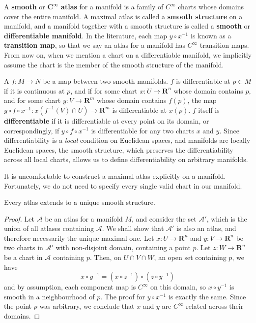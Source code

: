 A {\bf smooth} or {\bf $\mathbf{C^\infty}$ atlas} for a manifold is a family of $C^\infty$ charts whose domains cover the entire manifold. A maximal atlas is called a {\bf smooth structure} on a manifold, and a manifold together with a smooth structure is called a {\bf smooth} or {\bf differentiable manifold}. In the literature, each map $y \circ x^{-1}$ is known as a {\bf transition map}, so that we say an atlas for a manifold has $C^\infty$ transition maps. From now on, when we mention a chart on a differentiable manifold, we implicitly assume the chart is the member of the smooth structure of the manifold.

A $f:M \to N$ be a map between two smooth manifolds. $f$ is differentiable at $p \in M$ if it is continuous at $p$, and if for some chart $x:U \to \mathbf{R}^n$ whose domain contains $p$, and for some chart $y:V \to \mathbf{R}^m$ whose domain contains $f(p)$, the map $y \circ f \circ x^{-1}:x(f^{-1}(V) \cap U) \to \mathbf{R}^m$ is differentiable at $x(p)$. $f$ itself is {\bf differentiable} if it is differentiable at every point on its domain, or correspondingly, if $y \circ f \circ x^{-1}$ is differentiable for any two charts $x$ and $y$. Since differentiability is a {\it local} condition on Euclidean spaces, and manifolds are locally Euclidean spaces, the smooth structure, which preserves the differentiability across all local charts, allows us to define differentiability on arbitrary manifolds.

It is uncomfortable to construct a maximal atlas explicitly on a manifold. Fortunately, we do not need to specify every single valid chart in our manifold.

\begin{lemma}
    Every atlas extends to a unique smooth structure.
\end{lemma}
\begin{proof}
Let $\mathcal{A}$ be an atlas for a manifold $M$, and consider the set $\mathcal{A}'$, which is the union of all atlases containing $\mathcal{A}$. We shall show that $\mathcal{A}'$ is also an atlas, and therefore necessarily the unique maximal one. Let $x:U \to \mathbf{R}^n$ and $y:V \to \mathbf{R}^n$ be two charts in $\mathcal{A}'$ with non-disjoint domain, containing a point $p$. Let $z:W \to \mathbf{R}^n$ be a chart in $\mathcal{A}$ containing $p$. Then, on $U \cap V \cap W$, an open set containing $p$, we have
%
\[ x \circ y^{-1} = (x \circ z^{-1}) \circ (z \circ y^{-1}) \]
%
and by assumption, each component map is $C^\infty$ on this domain, so $x \circ y^{-1}$ is smooth in a neighbourhood of $p$. The proof for $y \circ x^{-1}$ is exactly the same. Since the point $p$ was arbitrary, we conclude that $x$ and $y$ are $C^\infty$ related across their domains.
\end{proof}

